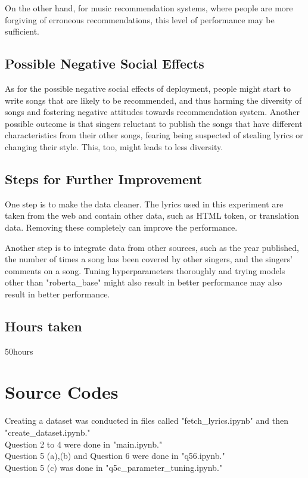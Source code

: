 \documentclass[a4paper,11pt]{article}
\begin{document}
On the other hand, for music recommendation systems, where people are more forgiving of erroneous recommendations, this level of performance may be sufficient.

\subsection{Possible Negative Social Effects}

As for the possible negative social effects of deployment, people might start to write songs that 
are likely to be recommended, and thus harming the diversity of songs and fostering negative attitudes towards recommendation system.
Another possible outcome is that singers reluctant to publish the songs that have different characteristics from their other songs,
fearing being suspected of stealing lyrics or changing their style.
This, too, might leads to less diversity.

\subsection{Steps for Further Improvement}
One step is to make the data cleaner.
The lyrics used in this experiment are taken from the web and contain other data, such as 
HTML token, or translation data. 
Removing these completely can improve the performance.

Another step is to integrate data from other sources, such as the year published, the number of times a song has been covered by other singers, and the singers' comments on a song.
Tuning hyperparameters thoroughly and trying models other than "roberta\_base" might also result in better performance may also result in better performance.

\subsection{Hours taken}
50hours

\section{Source Codes}
Creating a dataset was conducted in files called "fetch\_lyrics.ipynb" and then "create\_dataset.ipynb." \\
Question 2 to 4 were done in "main.ipynb."\\
Question 5 (a),(b) and Question 6 were done in "q56.ipynb." \\
Question 5 (c) was done in "q5c\_parameter\_tuning.ipynb."
\end{document}
